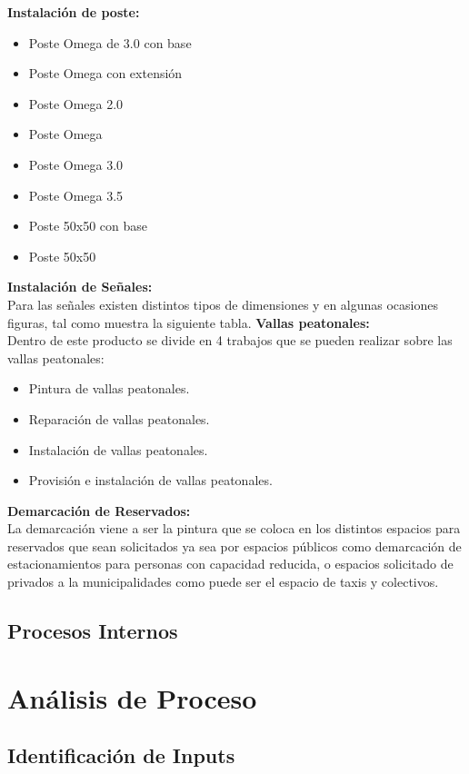 	\textbf{Instalación de poste: }\\
	\begin{itemize}
	\item Poste Omega de 3.0 con base
	\item Poste Omega con extensión
	\item Poste Omega 2.0
	\item Poste Omega
	\item Poste Omega 3.0
	\item Poste Omega 3.5
	\item Poste 50x50 con base
	\item Poste 50x50
	\end{itemize}
	\textbf{Instalación de Señales:}\\
	Para las señales existen distintos tipos de dimensiones y en algunas ocasiones figuras, tal como muestra la siguiente tabla.
	\textbf{Vallas peatonales: }\\
	Dentro de este producto se divide en 4 trabajos que se pueden realizar sobre las vallas peatonales:
	\begin{itemize}
	\item Pintura de vallas peatonales.
	\item Reparación de vallas peatonales.
	\item Instalación de vallas peatonales.
	\item Provisión e instalación de vallas peatonales.
	\end{itemize}

\textbf{Demarcación de Reservados: }\\
	La demarcación viene a ser la pintura que se coloca en los distintos espacios para reservados que sean solicitados ya sea por espacios públicos como demarcación de estacionamientos para personas con capacidad reducida, o espacios solicitado de privados a la municipalidades como puede ser el espacio de taxis y colectivos.


	\subsection{Procesos Internos}
\section{Análisis de Proceso}
	\subsection{Identificación de Inputs}
